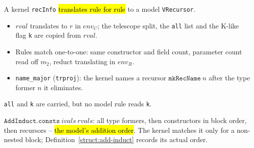 \begin{definition}
\label{struct:tr-recursor}
\leanok
{}

 A kernel \texttt{recInfo} \hl{translates rule for rule} to a model
\texttt{VRecursor}.
\begin{itemize}
\item $rval$ translates to $r$ in $env_C$; the telescope split, the \texttt{all} list and
the K-like flag \texttt{k} are copied from $rval$.
\item Rules match one-to-one: same constructor and field count, parameter count read off
$m_2$, reduct translating in $env_R$.
\item \texttt{name\_major} (\texttt{trproj}): the kernel names a recursor
$\mathtt{mkRecName}\ n$ after the type former $n$ it eliminates.
\end{itemize}
 \texttt{all}  and
\texttt{k}  are carried, but no
model rule reads \texttt{k}.
\end{definition}

\begin{definition}
\label{def:add-induct-consts}
\leanok
{}

 $\mathtt{AddInduct.consts}\ ivals\ rvals$: all type formers, then
constructors in block order, then recursors -- \hl{the model's addition order}. The
kernel matches it only for a non-nested block; Definition~\ref{struct:add-induct} records
its actual order.
\end{definition}

